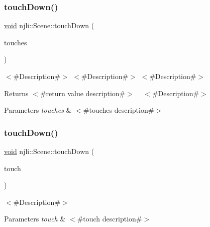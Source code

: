 \subsubsection{\texorpdfstring{touch\+Down()}{touchDown()}\hspace{0.1cm}{\footnotesize\ttfamily [1/2]}}
{\footnotesize\ttfamily \mbox{\hyperlink{_thread_8h_af1e856da2e658414cb2456cb6f7ebc66}{void}} njli\+::\+Scene\+::touch\+Down (\begin{DoxyParamCaption}\item[{\mbox{\hyperlink{classnjli_1_1_device_touch}{Device\+Touch}} $\ast$$\ast$}]{touches }\end{DoxyParamCaption})}

$<$\#\+Description\#$>$ $<$\#\+Description\#$>$ $<$\#\+Description\#$>$

\begin{DoxyReturn}{Returns}
$<$\#return value description\#$>$ ~\newline
$<$\#\+Description\#$>$
\end{DoxyReturn}

\begin{DoxyParams}{Parameters}
{\em touches} & $<$\#touches description\#$>$ \\
\hline
\end{DoxyParams}
\mbox{\label{classnjli_1_1_scene_af38110449fc118d5656bb95ff8885ccb}} 
\subsubsection{\texorpdfstring{touch\+Down()}{touchDown()}\hspace{0.1cm}{\footnotesize\ttfamily [2/2]}}
{\footnotesize\ttfamily \mbox{\hyperlink{_thread_8h_af1e856da2e658414cb2456cb6f7ebc66}{void}} njli\+::\+Scene\+::touch\+Down (\begin{DoxyParamCaption}\item[{const \mbox{\hyperlink{classnjli_1_1_device_touch}{Device\+Touch}} \&}]{touch }\end{DoxyParamCaption})}

$<$\#\+Description\#$>$


\begin{DoxyParams}{Parameters}
{\em touch} & $<$\#touch description\#$>$ \\
\hline
\end{DoxyParams}
\mbox{\label{classnjli_1_1_scene_a8e22ab9072c414608daa632c3cff9c96}} 
